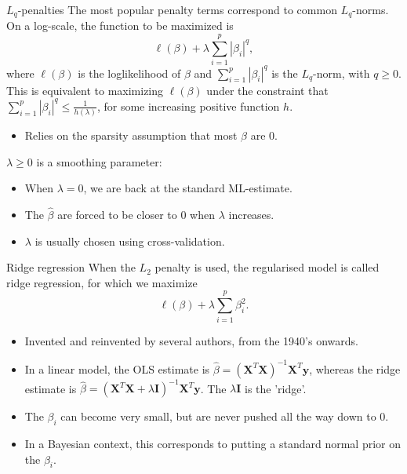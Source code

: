 \documentclass[10pt,handout]{beamer}
\begin{document}
\begin{frame}{$L_q$-penalties}
The most popular penalty terms correspond to common {\color{uured}$L_q$-norms}. \pause On a log-scale, the function to be maximized is
$$\ell(\beta)+\lambda\sum_{i=1}^p|\beta_i|^q,$$
where $\ell(\beta)$ is the loglikelihood of $\beta$ and $\sum_{i=1}^p|\beta_i|^q$ is the $L_q$-norm, with $q\geq 0$.\\[3mm]\pause
This is equivalent to maximizing $\ell(\beta)$ under the constraint that $\sum_{i=1}^p|\beta_i|^q\leq\frac{1}{h(\lambda)}$, for some increasing positive function $h$.\pause
\begin{itemize}
\item Relies on the {\color{uured}sparsity} assumption that most $\beta$ are 0.\\[3mm]\pause
\end{itemize}
$\lambda\geq 0$ is a {\color{uured}smoothing parameter}:
\begin{itemize}
\item When $\lambda=0$, we are back at the standard ML-estimate.
\item The $\hat{\beta}$ are forced to be closer to 0 when $\lambda$ increases.
\item $\lambda$ is usually chosen using cross-validation.
\end{itemize}
\end{frame}


\begin{frame}{Ridge regression}
When the $L_2$ penalty is used, the regularised model is called {\color{uured}ridge regression}, for which we maximize
$$\ell(\beta)+\lambda\sum_{i=1}^p\beta_i^2.$$
\begin{itemize}
\item Invented and reinvented by several authors, from the 1940's onwards.\\[3mm]\pause
\item In a linear model, the OLS estimate is $\hat{\beta}=(\mathbf{X}^T\mathbf{X})^{-1}\mathbf{X}^T\mathbf{y}$, whereas the ridge estimate is $\hat{\beta}=(\mathbf{X}^T\mathbf{X}+\lambda \mathbf{I})^{-1}\mathbf{X}^T\mathbf{y}$. The $\lambda \mathbf{I}$ is the 'ridge'.\\[3mm]\pause
\item The $\beta_i$ can become very small, but are never pushed all the way down to 0.\\[3mm]\pause
\item In a Bayesian context, this corresponds to putting a standard normal prior on the $\beta_i$.
\end{itemize}
\end{frame}
\end{document}

